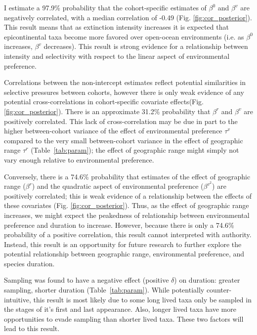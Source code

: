 \documentclass[11pt]{article}
\begin{document}
I estimate a 97.9\% probability that the cohort-specific estimates of \(\beta^{0}\) and \(\beta^{v}\) are negatively correlated, with a median correlation of -0.49 (Fig. \ref{fig:cor_posterior}). This result means that as extinction intensity increases it is expected that epicontinental taxa become more favored over open-ocean environments (i.e. as \(\beta^{0}\) increases, \(\beta^{v}\) decreases). This result is strong evidence for a relationship between intensity and selectivity with respect to the linear aspect of environmental preference. 

Correlations between the non-intercept estimates reflect potential similarities in selective pressures between cohorts, however there is only weak evidence of any potential cross-correlations in cohort-specific covariate effects(Fig. \ref{fig:cor_posterior}). There is an approximate 31.2\% probability that \(\beta^{r}\) and \(\beta^{v}\) are positively correlated. This lack of cross-correlation may be due in part to the higher between-cohort variance of the effect of environmental preference \(\tau^{v}\) compared to the very small between-cohort variance in the effect of geographic range \(\tau^{r}\) (Table~\ref{tab:param}); the effect of geographic range might simply not vary enough relative to environmental preference. 

Conversely, there is a 74.6\% probability that estimates of the effect of geographic range (\(\beta^{r}\)) and the quadratic aspect of environmental preference (\(\beta^{v^{2}}\)) are positively correlated; this is weak evidence of a relationship between the effects of these covariates (Fig. \ref{fig:cor_posterior}). Thus, as the effect of geographic range increases, we might expect the peakedness of relationship between environmental preference and duration to increase. However, because there is only a 74.6\% probability of a positive correlation, this result cannot interpreted with authority. Instead, this result is an opportunity for future research to further explore the potential relationship between geographic range, environmental preference, and species duration.

Sampling was found to have a negative effect (positive \(\delta\)) on duration: greater sampling, shorter duration (Table~\ref{tab:param}). While potentially counter-intuitive, this result is most likely due to some long lived taxa only be sampled in the stages of it's first and last appearance. Also, longer lived taxa have more opportunities to evade sampling than shorter lived taxa. These two factors will lead to this result. 
\end{document}
